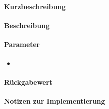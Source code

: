 \subsubsection{}%

\paragraph*{Kurzbeschreibung}
\paragraph*{Beschreibung}
\paragraph*{Parameter}
\begin{itemize}
    \item %
\end{itemize}
\paragraph*{Rückgabewert}
\paragraph*{Notizen zur Implementierung}%